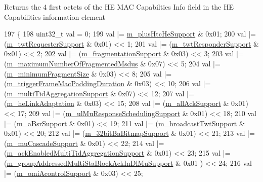 \begin{DoxyReturn}{Returns}
the 4 first octets of the HE M\+AC Capabilties Info field in the HE Capabilities information element 
\end{DoxyReturn}

\begin{DoxyCode}
197 \{
198   uint32\_t val = 0;
199   val |= \hyperlink{classns3_1_1HeCapabilities_aa6a2ca2426a417f0bc5bc7680ec8b4c1}{m\_plusHtcHeSupport} & 0x01;
200   val |= (\hyperlink{classns3_1_1HeCapabilities_a382c23809a167949cec43da25c8f0608}{m\_twtRequesterSupport} & 0x01) << 1;
201   val |= (\hyperlink{classns3_1_1HeCapabilities_a8a734c713abb42b32e4078c761c605a8}{m\_twtResponderSupport} & 0x01) << 2;
202   val |= (\hyperlink{classns3_1_1HeCapabilities_a84a70882f86c47a8d78ab0746978eb9f}{m\_fragmentationSupport} & 0x03) << 3;
203   val |= (\hyperlink{classns3_1_1HeCapabilities_a05c27329d2e963ea800201b5180ed4c5}{m\_maximumNumberOfFragmentedMsdus} & 0x07) << 5;
204   val |= (\hyperlink{classns3_1_1HeCapabilities_a8a64ff2ed1cd3136fd8026c3562c9d9c}{m\_minimumFragmentSize} & 0x03) << 8;
205   val |= (\hyperlink{classns3_1_1HeCapabilities_a26cba20100867ce3dc4eff91ca93f326}{m\_triggerFrameMacPaddingDuration} & 0x03) << 10;
206   val |= (\hyperlink{classns3_1_1HeCapabilities_a08469c5d5a290f2728c674df38a681a1}{m\_multiTidAggregationSupport} & 0x07) << 12;
207   val |= (\hyperlink{classns3_1_1HeCapabilities_ae2b5bc6d8d8b218dbac1efdacc689abb}{m\_heLinkAdaptation} & 0x03) << 15;
208   val |= (\hyperlink{classns3_1_1HeCapabilities_a36325eaad1246d1ee77dbdbae43c608c}{m\_allAckSupport} & 0x01) << 17;
209   val |= (\hyperlink{classns3_1_1HeCapabilities_abb88eec28bfa8f93ea73c3643485d33d}{m\_ulMuResponseSchedulingSupport} & 0x01) << 18;
210   val |= (\hyperlink{classns3_1_1HeCapabilities_aa7a38ebf70a7133df40a734171f542b2}{m\_aBsrSupport} & 0x01) << 19;
211   val |= (\hyperlink{classns3_1_1HeCapabilities_a4624bbde1e282a55475c95e392f025cf}{m\_broadcastTwtSupport} & 0x01) << 20;
212   val |= (\hyperlink{classns3_1_1HeCapabilities_a7629d4adebd2aaf5af6838ca23718485}{m\_32bitBaBitmapSupport} & 0x01) << 21;
213   val |= (\hyperlink{classns3_1_1HeCapabilities_a5a314c610b7489063772e07769ff9562}{m\_muCascadeSupport} & 0x01) << 22;
214   val |= (\hyperlink{classns3_1_1HeCapabilities_a483ff6eafe4090c371f997f3b3d00533}{m\_ackEnabledMultiTidAggregationSupport} & 0x01) << 23;
215   val |= (\hyperlink{classns3_1_1HeCapabilities_a8ea8d23d3e28711cd82d32cfd2723f7a}{m\_groupAddressedMultiStaBlockAckInDlMuSupport} & 0x01
      ) << 24;
216   val |= (\hyperlink{classns3_1_1HeCapabilities_a298a39ff42fc92cdb7eabf4dc93212f1}{m\_omiAcontrolSupport} & 0x03) << 25;

\end{DoxyCode}
